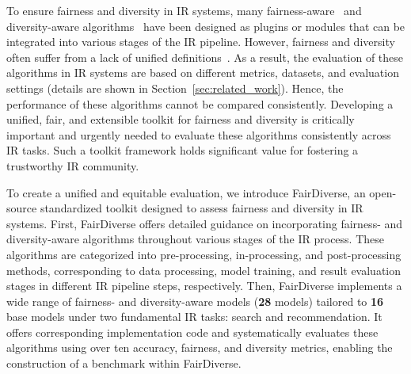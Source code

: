 \documentclass[sigconf]{acmart}
\begin{document}
To ensure fairness and diversity in IR systems, many fairness-aware~\cite{fairrec, xu2023p, TaxRank, SDRO, APR, FairNeg, cpfair, rus2024study} and diversity-aware algorithms~\cite{li2022fairness, santos2010exploiting, qin2020diversifying, yan2021diversification} have been designed as plugins or modules that can be integrated into various stages of the IR pipeline. However, fairness and diversity often suffer from a lack of unified definitions~\cite{li2022fairness, LLM4FairSurvey}. 
As a result, the evaluation of these algorithms in IR systems are based on different metrics, datasets, and evaluation settings (details are shown in Section~\ref{sec:related_work}). Hence, the performance of these algorithms cannot be compared consistently. Developing a unified, fair, and extensible toolkit for fairness and diversity is critically important and urgently needed to evaluate these algorithms consistently across IR tasks. Such a toolkit framework holds significant value for fostering a trustworthy IR community.

To create a unified and equitable evaluation, we introduce FairDiverse, an open-source standardized toolkit designed to assess fairness and diversity in IR systems.
First, FairDiverse offers detailed guidance on incorporating fairness- and diversity-aware algorithms throughout various stages of the IR process. These algorithms are categorized into pre-processing, in-processing, and post-processing methods, corresponding to data processing, model training, and result evaluation stages in different IR pipeline steps, respectively. 
Then, FairDiverse implements a wide range of fairness- and diversity-aware models (\textbf{28} models) tailored to \textbf{16} base models under two fundamental IR tasks: search and recommendation. 
It offers corresponding implementation code and systematically evaluates these algorithms using over ten accuracy, fairness, and diversity metrics, enabling the construction of a benchmark within FairDiverse.

\end{document}
